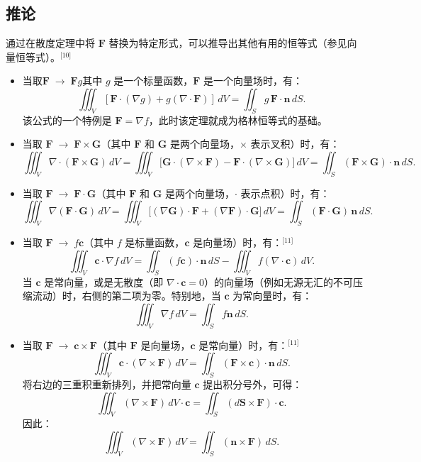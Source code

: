 \subsection{推论}
通过在散度定理中将 $\mathbf{F}$ 替换为特定形式，可以推导出其他有用的恒等式（参见向量恒等式）。\(^\text{[10]}\)
\begin{itemize}
\item 当取$\mathbf{F} \;\rightarrow\; \mathbf{F}g$其中 $g$ 是一个标量函数，$\mathbf{F}$ 是一个向量场时，有：
$$
\iiint_{V} \left[\mathbf{F} \cdot (\nabla g) + g (\nabla \cdot \mathbf{F}) \right] \, dV
=\iint_{S} g\,\mathbf{F} \cdot \mathbf{n} \, dS .~
$$
该公式的一个特例是 $\mathbf{F} = \nabla f$，此时该定理就成为格林恒等式的基础。
\item 当取 $\mathbf{F} \;\rightarrow\; \mathbf{F} \times \mathbf{G}$（其中 $\mathbf{F}$ 和 $\mathbf{G}$ 是两个向量场，$\times$ 表示叉积）时，有：
$$
\iiint_{V} \nabla \cdot (\mathbf{F} \times \mathbf{G}) \, dV
= \iiint_{V} \big[ \mathbf{G} \cdot (\nabla \times \mathbf{F}) - \mathbf{F} \cdot (\nabla \times \mathbf{G}) \big] \, dV
= \iint_{S} (\mathbf{F} \times \mathbf{G}) \cdot \mathbf{n} \, dS .~
$$
\item 当取 $\mathbf{F} \;\rightarrow\; \mathbf{F} \cdot \mathbf{G}$（其中 $\mathbf{F}$ 和 $\mathbf{G}$ 是两个向量场，$\cdot$ 表示点积）时，有：
$$
\iiint_{V} \nabla (\mathbf{F} \cdot \mathbf{G}) \, dV
= \iiint_{V} \big[ (\nabla \mathbf{G}) \cdot \mathbf{F} + (\nabla \mathbf{F}) \cdot \mathbf{G} \big] \, dV
= \iint_{S} (\mathbf{F} \cdot \mathbf{G}) \, \mathbf{n} \, dS.~
$$
\item 当取 $\mathbf{F} \;\rightarrow\; f\mathbf{c}$（其中 $f$ 是标量函数，$\mathbf{c}$ 是向量场）时，有：\(^\text{[11]}\)
$$
\iiint_{V} \mathbf{c} \cdot \nabla f \, dV
= \iint_{S} (f \mathbf{c}) \cdot \mathbf{n} \, dS
- \iiint_{V} f (\nabla \cdot \mathbf{c}) \, dV.~
$$
当 $\mathbf{c}$ 是常向量，或是无散度（即 $\nabla \cdot \mathbf{c} = 0$）的向量场（例如无源无汇的不可压缩流动）时，右侧的第二项为零。特别地，当 $\mathbf{c}$ 为常向量时，有：
$$
\iiint_{V} \nabla f \, dV
= \iint_{S} f \mathbf{n} \, dS.~
$$
\item 当取 $\mathbf{F} \;\rightarrow\; \mathbf{c} \times \mathbf{F}$（其中 $\mathbf{F}$ 是向量场，$\mathbf{c}$ 是常向量）时，有：\(^\text{[11]}\)
$$
\iiint_{V} \mathbf{c} \cdot (\nabla \times \mathbf{F}) \, dV
= \iint_{S} (\mathbf{F} \times \mathbf{c}) \cdot \mathbf{n} \, dS.~
$$
将右边的三重积重新排列，并把常向量 $\mathbf{c}$ 提出积分号外，可得：
$$
\iiint_{V} (\nabla \times \mathbf{F}) \, dV \cdot \mathbf{c}
= \iint_{S} (d\mathbf{S} \times \mathbf{F}) \cdot \mathbf{c}.~
$$
因此：
$$
\iiint_{V} (\nabla \times \mathbf{F}) \, dV
= \iint_{S} (\mathbf{n} \times \mathbf{F}) \, dS.~
$$
\end{itemize}
